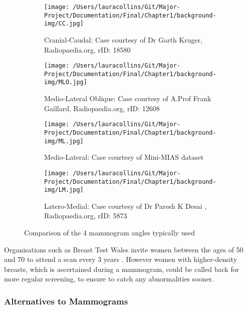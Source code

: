 \begin{figure}[!ht]
  \center
  \begin{subfigure}[ht!]{0.4\textwidth}
        \texttt{[image: /Users/lauracollins/Git/Major-Project/Documentation/Final/Chapter1/background-img/CC.jpg]}
        \caption{Cranial-Caudal: Case courtesy of Dr Garth Kruger, Radiopaedia.org, rID: 18580}
        \label{fig:CC}
    \end{subfigure}
    \hspace{\fill}
    \begin{subfigure}[ht!]{0.4\textwidth}
          \texttt{[image: /Users/lauracollins/Git/Major-Project/Documentation/Final/Chapter1/background-img/MLO.jpg]}
          \caption{Medio-Lateral Oblique: Case courtesy of A.Prof Frank Gaillard, Radiopaedia.org, rID: 12608}
          \label{fig:MLO}
    \end{subfigure}

    \begin{subfigure}[ht!]{0.4\textwidth}
          \texttt{[image: /Users/lauracollins/Git/Major-Project/Documentation/Final/Chapter1/background-img/ML.jpg]}
          \caption{Medio-Lateral: Case courtesy of Mini-MIAS dataset \cite{Suckling_1994}}
          \label{fig:LM}
    \end{subfigure}
    \hspace{\fill}
    \begin{subfigure}[ht!]{0.4\textwidth}
          \texttt{[image: /Users/lauracollins/Git/Major-Project/Documentation/Final/Chapter1/background-img/LM.jpg]}
          \caption{Latero-Medial: Case courtesy of Dr Paresh K Desai , Radiopaedia.org, rID: 5873}
          \label{fig:ML}
    \end{subfigure}
  \caption{Comparison of the 4 mammogram angles typically used}
  \label{fig:scan-angles}
\end{figure}

Organisations such as Breast Test Wales invite women between the ages of 50 and 70 to attend a scan every 3 years \cite{Informed_Choice_about_Cancer_Screening_2013}. However women with higher-density breasts, which is ascertained during a mammogram, could be called back for more regular screening, to ensure to catch any abnormalities sooner.

\subsubsection{Alternatives to Mammograms}

